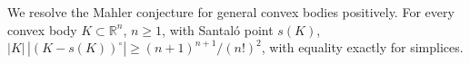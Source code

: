 We resolve the Mahler conjecture for general convex bodies positively.
For every convex body $K\subset\mathbb R^n$, $n\ge1$, with Santal\'o point
$s(K)$,
$|K|\,|(K-s(K))^\circ|\ge (n+1)^{n+1}/(n!)^2$,
with equality exactly for simplices.
